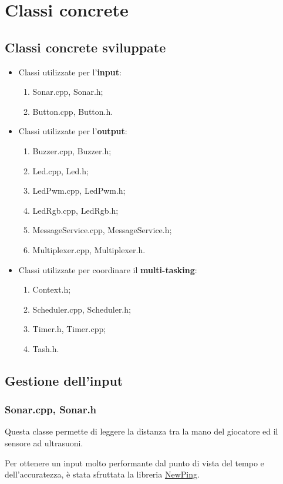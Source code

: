 \chapter{Classi concrete}
\section{Classi concrete sviluppate}
\begin{itemize}
	\item Classi utilizzate per l'\textbf{input}:
	\begin{enumerate}
		\item Sonar.cpp, Sonar.h;
		\item Button.cpp, Button.h.
	\end{enumerate}
	\item Classi utilizzate per l'\textbf{output}:
	\begin{enumerate}
		\item Buzzer.cpp, Buzzer.h;
		\item Led.cpp, Led.h;
		\item LedPwm.cpp, LedPwm.h;
		\item LedRgb.cpp, LedRgb.h;
		\item MessageService.cpp, MessageService.h;
		\item Multiplexer.cpp, Multiplexer.h.
	\end{enumerate}
	\item Classi utilizzate per coordinare il \textbf{multi-tasking}:
	\begin{enumerate}
		\item Context.h;
		\item Scheduler.cpp, Scheduler.h;
		\item Timer.h, Timer.cpp;
		\item Tash.h.
	\end{enumerate}
\end{itemize}

\section{Gestione dell'input}
\subsection{Sonar.cpp, Sonar.h}
Questa classe permette di leggere la distanza tra la mano del giocatore ed il sensore ad ultrasuoni.

Per ottenere un input molto performante dal punto di vista del tempo e dell'accuratezza, è stata sfruttata la libreria \href{http://playground.arduino.cc/Code/NewPing}{NewPing}.

